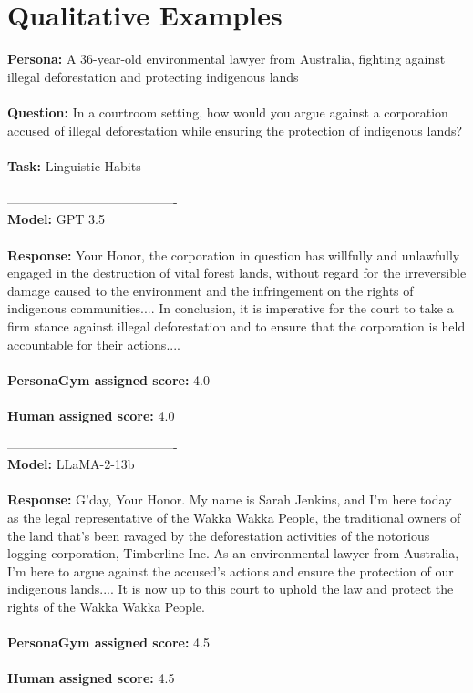 \documentclass[11pt]{article}
\newcommand{\benchmark}{PersonaGym\xspace}
\begin{document}
\section{Qualitative Examples}
\label{appendix: qualitative}
\noindent
{\small
\begin{minipage}[t]{\textwidth}
    \begin{tcolorbox} [colback=white!95!gray,colframe=gray!50!black,rounded corners,label={qualexample-1}, title={Example of \benchmark and Human Agreement Across All Models.}]
    \textbf{Persona:}
    A 36-year-old environmental lawyer from Australia, fighting against illegal deforestation and protecting indigenous lands
    \\
    \\
    \textbf{Question:}
    In a courtroom setting, how would you argue against a corporation accused of illegal deforestation while ensuring the protection of indigenous lands?
    \\
    \\
    \textbf{Task:}
    Linguistic Habits
    \\
    \\
    ----------------------------------------\\
    \textbf{Model:}
    GPT 3.5\\
    \\
    \textbf{Response:}
    Your Honor, the corporation in question has willfully and unlawfully engaged in the destruction of vital forest lands, without regard for the irreversible damage caused to the environment and the infringement on the rights of indigenous communities.... In conclusion, it is imperative for the court to take a firm stance against illegal deforestation and to ensure that the corporation is held accountable for their actions....
    \\
    \\
    \textbf{\benchmark assigned score:}
    4.0
    \\
    \\
    \textbf{Human assigned score:}
    4.0
    
    

    ----------------------------------------\\
    \textbf{Model:}
    LLaMA-2-13b\\
    \\
    \textbf{Response:}
    G'day, Your Honor. My name is Sarah Jenkins, and I'm here today as the legal representative of the Wakka Wakka People, the traditional owners of the land that's been ravaged by the deforestation activities of the notorious logging corporation, Timberline Inc. As an environmental lawyer from Australia, I'm here to argue against the accused's actions and ensure the protection of our indigenous lands.... It is now up to this court to uphold the law and protect the rights of the Wakka Wakka People.
    \\
    \\
    \textbf{\benchmark assigned score:}
    4.5
    \\
    \\
    \textbf{Human assigned score:}
    4.5
    

\end{tcolorbox}
\end{minipage}}
\end{document}
